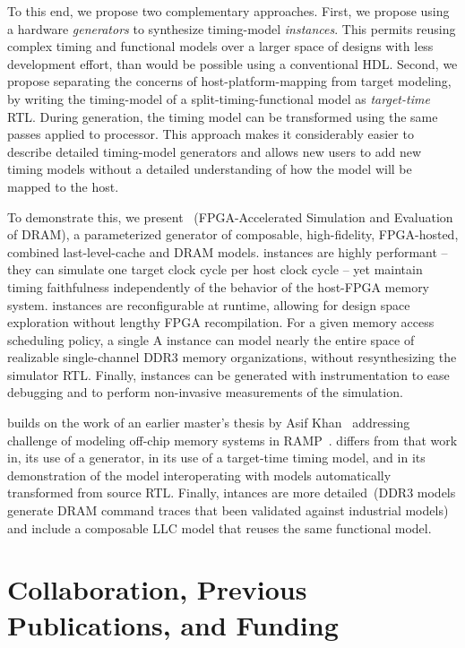 To this end, we propose two complementary approaches.  First, we propose using
a hardware \emph{generators} to synthesize timing-model \emph{instances}. This
permits reusing complex timing and functional models over a larger space of
designs with less development effort, than would be possible using a
conventional HDL.  Second, we propose separating the concerns of
host-platform-mapping from target modeling, by writing the timing-model of a
split-timing-functional model as \emph{target-time} RTL. During generation, the
timing model can be transformed using the same passes applied to processor.
This approach makes it considerably easier to describe detailed timing-model
generators and allows new users to add new timing models without a detailed
understanding of how the model will be mapped to the host.

To demonstrate this, we present \PNAME~(FPGA-Accelerated Simulation and
Evaluation of DRAM), a parameterized generator of composable, high-fidelity,
FPGA-hosted, combined last-level-cache and DRAM models.  \PNAME instances are
highly performant -- they can simulate one target clock cycle per host clock
cycle -- yet maintain timing faithfulness independently of the behavior of the
host-FPGA memory system.  \PNAME instances are reconfigurable at runtime,
allowing for design space exploration without lengthy FPGA recompilation.  For
a given memory access scheduling policy, a single A \PNAME instance can model
nearly the entire space of realizable single-channel DDR3 memory organizations,
without resynthesizing the simulator RTL. Finally, \PNAME instances can be
generated with instrumentation to ease debugging and to perform non-invasive
measurements of the simulation.

\PNAME builds on the work of an earlier master's thesis by Asif
Khan~\cite{khanmasters} addressing challenge of modeling off-chip memory
systems in RAMP~\cite{ramp}. \PNAME differs from that work in, its use of a
generator, in its use of a target-time timing model, and in its demonstration
of the model interoperating with models automatically transformed from source
RTL. Finally, \PNAME intances are more detailed~(DDR3 models generate DRAM
command traces that been validated against industrial models) and include a
composable LLC model that reuses the same functional model.

\section{Collaboration, Previous Publications, and Funding}

